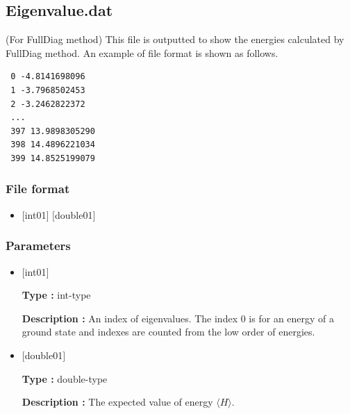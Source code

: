 \newpage
\subsection{Eigenvalue.dat}
\label{Subsec:eigenvalue}
(For FullDiag method) This file is outputted to show the energies calculated by FullDiag method. An example of file format is shown as follows.\\
\begin{minipage}{12.5cm}
\begin{screen}
\begin{verbatim}
 0 -4.8141698096 
 1 -3.7968502453 
 2 -3.2462822372 
 ...
 397 13.9898305290 
 398 14.4896221034 
 399 14.8525199079 
\end{verbatim}
\end{screen}
\end{minipage}

\subsubsection{File format}
 \begin{itemize}
   \item $[$int01$]$ $[$double01$]$ 
  \end{itemize}
\subsubsection{Parameters}
 \begin{itemize}

  \item  $[$int01$]$
  
 {\bf Type :} int-type

{\bf Description :} An index of eigenvalues. The index 0 is for an energy of a ground state and indexes are counted from the low order of energies.

  \item  $[$double01$]$
  
 {\bf Type :} double-type

{\bf Description :} The expected value of energy $\langle H \rangle$.
 
 \end{itemize}



\newpage

